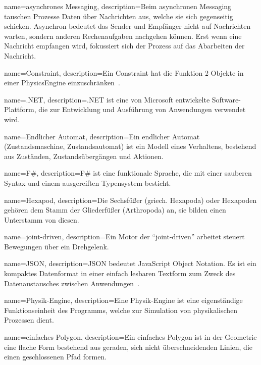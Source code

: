 %
%


%
%

%
%
{
  name={asynchrones Messaging},
  description={Beim asynchronen Messaging tauschen Prozesse Daten über Nachrichten aus,
    welche sie sich gegenseitig schicken.
    Asynchron bedeutet das Sender und Empfänger nicht auf Nachrichten warten,
    sondern anderen Rechenaufgaben nachgehen können.
    Erst wenn eine Nachricht empfangen wird, fokussiert sich der Prozess auf das Abarbeiten der Nachricht.}
}

{
  name={Constraint},
  description={Ein Constraint hat die Funktion 2 Objekte in einer \gls{PhysicsEngine} einzuschränken~\cite{gamedev:constraints}.}
}

{
  name={.NET},
  description={.NET ist eine von Microsoft entwickelte Software-Plattform,
    die zur Entwicklung und Ausführung von Anwendungen verwendet wird.}
}

{
  name={Endlicher Automat},
  description={Ein endlicher Automat (Zustandsmaschine, Zustandsautomat) ist ein Modell eines Verhaltens,
    bestehend aus Zuständen, Zustandsübergängen und Aktionen.}
}

{
  name={F\#},
  description={F\# ist eine funktionale Sprache,
    die mit einer sauberen Syntax und einem ausgereiften Typensystem besticht.}
}

{
  name={Hexapod},
  description={Die Sechsfüßer (griech. Hexapoda) oder Hexapoden
    gehören dem Stamm der Gliederfüßer (Arthropoda) an,
    sie bilden einen Unterstamm von diesen.}
}

{
  name={joint-driven},
  description={Ein Motor der ``joint-driven'' arbeitet steuert Bewegungen über ein Drehgelenk.}
}

{
  name={JSON},
  description={JSON bedeutet JavaScript Object Notation.
    Es ist ein kompaktes Datenformat in einer einfach lesbaren Textform
    zum Zweck des Datenaustausches zwischen Anwendungen~\cite{json}.}
}

{
  name={Physik-Engine},
  description={Eine Physik-Engine ist eine eigenständige Funktionseinheit des Programms,
    welche zur Simulation von physikalischen Prozessen dient.}
}

{
  name={einfaches Polygon},
  description={Ein einfaches Polygon ist in der Geometrie eine flache Form bestehend aus geraden,
    sich nicht überschneidenden Linien, die einen geschlossenen Pfad formen.}
}
